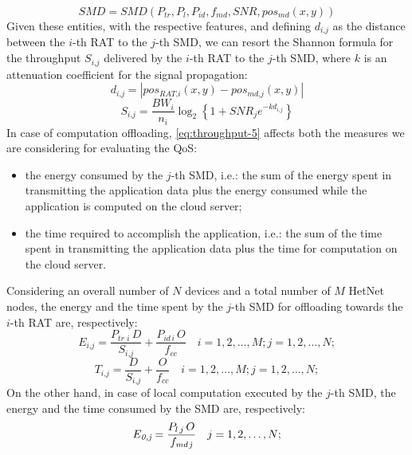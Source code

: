 \documentclass[twoside,openright]{report}
\begin{document}
\begin{equation}
\label{SMD-5}
\textit{SMD} = \textit{SMD}(P_\textit{tr},P_l,P_\textit{id},f_\textit{md},\textit{SNR}, pos_\textit{md}(x,y))
\end{equation} 
Given these entities, with the respective features, and defining $d_\textit{i,j}$ as the distance between the $i$-th \gls{RAT} to the $j$-th \gls{SMD}, we can resort the Shannon formula for the throughput $S_\textit{i,j}$ delivered by the $i$-th \gls{RAT} to the $j$-th \gls{SMD}, where $k$ is an attenuation coefficient for the signal propagation:
\begin{equation}
\label{eq:distance-5}
d_\textit{i,j} = \left|pos_\textit{RAT,i}(x,y)-pos_\textit{md,j}(x,y)\right|
\end{equation}
\begin{equation}
\label{eq:throughput-5}
S_\textit{i,j} = \frac{\textit{BW}_i}{n_i}\log_2\left\{1+\textit{SNR}_j e^{-k d_\textit{i,j}} \right\}
\end{equation}
In case of computation offloading, \autoref{eq:throughput-5} affects both the measures we are considering for evaluating the \gls{QoS}: 
\begin{itemize}
\item{the energy consumed by the $j$-th \gls{SMD}, i.e.: the sum of the energy spent in transmitting the application data plus the energy consumed while the application is computed on the cloud server};
\item{the time required to accomplish the application, i.e.: the sum of the time spent in transmitting the application data plus the time for computation on the cloud server}.
\end{itemize} 

Considering an overall number of $N$ devices and a total number of $M$ \gls{HetNet} nodes, the energy and the time spent by the $j$-th \gls{SMD} for offloading towards the $i$-th \gls{RAT} are, respectively:
\begin{equation}
\label{eq:energyOD-5}
E_\textit{i,j} = \frac{P_\textit{tr i}\,D}{S_\textit{i,j}} + \frac{P_{id\,i}\,O }{f_{cc}} \quad i=1,2,\dots,M;j=1,2,\dots,N;
\end{equation}
\begin{equation}
\label{eq:timeOD-5}
T_\textit{i,j} = \frac{D}{S_\textit{i,j}} + \frac{O}{f_{cc}} \quad i=1,2,\dots,M;j=1,2,\dots,N;
\end{equation}
On the other hand, in case of local computation executed by the $j$-th \gls{SMD}, the energy and the time consumed by the \gls{SMD} are, respectively:
\begin{equation}
\label{eq:energyL-5}
E_\textit{0,j}=\frac{P_{l\,j}\,O}{f_\textit{md\,j}} \quad j=1,2,\dots,N;
\end{equation} 
\end{document}
